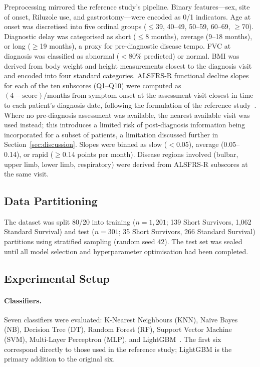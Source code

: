\documentclass[preprint,12pt]{elsarticle}
\begin{document}
Preprocessing mirrored the reference study's pipeline. Binary features---sex,
site of onset, Riluzole use, and gastrostomy---were encoded as 0/1 indicators.
Age at onset was discretised into five ordinal groups ($\leq$39, 40--49, 50--59,
60--69, $\geq$70). Diagnostic delay was categorised as short ($\leq$8 months),
average (9--18 months), or long ($\geq$19 months), a proxy for pre-diagnostic
disease tempo. FVC at diagnosis was classified as abnormal ($<$80\% predicted) or
normal. BMI was derived from body weight and height measurements closest to the
diagnosis visit and encoded into four standard categories. ALSFRS-R functional
decline slopes for each of the ten subscores (Q1--Q10) were
computed as $(4 - \text{score}) / \text{months from symptom onset}$ at the
assessment visit closest in time to each patient's diagnosis date, following the
formulation of the reference study~\cite{Papaiz2024}. Where no pre-diagnosis
assessment was available, the nearest available visit was used instead; this
introduces a limited risk of post-diagnosis information being incorporated for a
subset of patients, a limitation discussed further in Section~\ref{sec:discussion}.
Slopes were binned as slow ($<$0.05), average (0.05--0.14), or rapid
($\geq$0.14 points per month). Disease regions involved (bulbar, upper limb,
lower limb, respiratory) were derived from ALSFRS-R subscores at the same visit.

\subsection{Data Partitioning}

The dataset was split 80/20 into training ($n = 1{,}201$; 139 Short Survivors,
1,062 Standard Survival) and test ($n = 301$; 35 Short Survivors, 266 Standard
Survival) partitions using stratified sampling (random seed 42). The test set was
sealed until all model selection and hyperparameter optimisation had been completed.

\subsection{Experimental Setup}
\label{subsec:setup}

\paragraph{Classifiers.}
Seven classifiers were evaluated: K-Nearest Neighbours (KNN), Naïve Bayes (NB),
Decision Tree (DT), Random Forest (RF), Support Vector Machine (SVM),
Multi-Layer Perceptron (MLP), and LightGBM~\cite{ke2017lightgbm}. The first six
correspond directly to those used in the reference study; LightGBM is the primary
addition to the original six.
\end{document}
